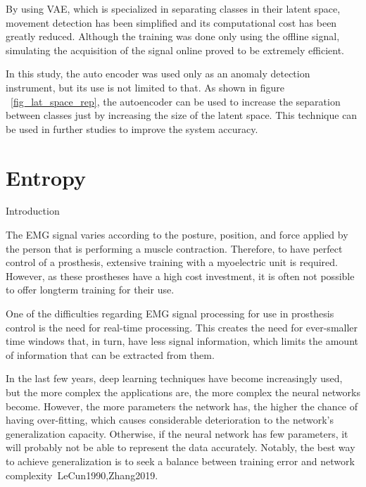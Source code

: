 \documentclass[a4paper, 12pt]{ppgeb}
\makeatletter
\renewcommand{\section}{\@startsection
{section}
{1}
{0mm}
{-\baselineskip}
{0.5\baselineskip}
{\large\bfseries\scshape}}
\makeatother
\begin{document}
By using \ac{VAE}, which is specialized in separating classes in their latent space, movement detection has been simplified and its computational cost has been greatly reduced. Although the training was done only using the offline signal, simulating the acquisition of the signal online proved to be extremely efficient.

In this study, the auto encoder was used only as an anomaly detection instrument, but its use is not limited to that. As shown in figure ~\ref{fig_lat_space_rep}, the autoencoder can be used to increase the separation between classes just by increasing the size of the latent space. This technique can be used in further studies to improve the system accuracy.

\chapter{Entropy}\label{ch:entropy}

\section{Introduction}

The \ac{EMG} signal varies according to the posture, position, and force applied by the person that is performing a muscle contraction. Therefore, to have perfect control of a prosthesis, extensive training with a myoelectric unit is required. However, as these prostheses have a high cost investment, it is often not possible to offer longterm training for their use.

One of the difficulties regarding \ac{EMG} signal processing for use in prosthesis control is the need for real-time processing. This creates the need for ever-smaller time windows that, in turn, have less signal information, which limits the amount of information that can be extracted from them.

In the last few years, deep learning techniques have become increasingly used, but the more complex the applications are, the more complex the neural networks become. However, the more parameters the network has, the higher the chance of having over-fitting, which causes considerable deterioration to the network’s generalization capacity. Otherwise, if the neural network has few parameters, it will probably not be able to represent the data accurately. Notably, the best way to achieve generalization is to seek a balance between training error and network complexity~\cite{mainreferences}{LeCun1990,Zhang2019}.
\end{document}
